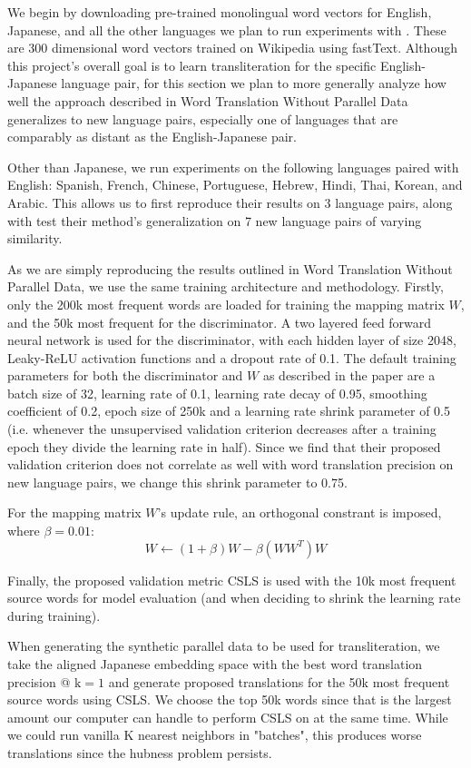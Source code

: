 \documentclass{article}
\begin{document}
We begin by downloading pre-trained monolingual word vectors for English, Japanese,
and all the other languages we plan to run experiments with \cite{bojanowski2017enriching}.
These are 300 dimensional word vectors trained on Wikipedia using fastText.
Although this project's overall goal is to learn transliteration for the specific
English-Japanese language pair, for this section we plan to more generally analyze
how well the approach described in Word Translation Without Parallel Data generalizes
to new language pairs, especially one of languages that are comparably as distant as
the English-Japanese pair.

Other than Japanese, we run experiments on the following languages paired with English:
Spanish, French, Chinese, Portuguese, Hebrew, Hindi, Thai, Korean, and Arabic. This
allows us to first reproduce their results on 3 language pairs, along with test their
method's generalization on 7 new language pairs of varying similarity.

As we are simply reproducing the results outlined in Word Translation Without Parallel
Data, we use the same training architecture and methodology. Firstly, only the 200k
most frequent words are loaded for training the mapping matrix $W$, and the 50k most
frequent for the discriminator. A two layered feed forward neural network is used
for the discriminator, with each hidden layer of size 2048, Leaky-ReLU activation
functions and a dropout rate of 0.1. The default training parameters for
both the discriminator and $W$ as described in the paper are a
batch size of 32, learning rate of 0.1, learning rate decay of 0.95, smoothing
coefficient of 0.2, epoch size of 250k and a learning rate shrink parameter of 0.5
(i.e. whenever the unsupervised validation criterion decreases after a training epoch
they divide the learning rate in half). Since we find that their proposed validation
criterion does not correlate as well with word translation precision on new language
pairs, we change this shrink parameter to 0.75.

For the mapping matrix $W$'s update rule, an orthogonal constrant is imposed, where
$\beta=0.01$:
$$
W \leftarrow (1 + \beta)W - \beta(WW^T)W
$$

Finally, the proposed validation metric CSLS is used with the 10k most frequent
source words for model evaluation (and when deciding to shrink the learning rate
during training).

When generating the synthetic parallel data to be used for transliteration, we take
the aligned Japanese embedding space with the best word translation precision
@ $\text{k}=1$ and generate proposed translations for the 50k most frequent
source words using CSLS. We choose the top 50k words since that is the largest
amount our computer can handle to perform CSLS on at the same time. While we could
run vanilla K nearest neighbors in "batches", this produces worse translations
since the hubness problem persists.
\end{document}
